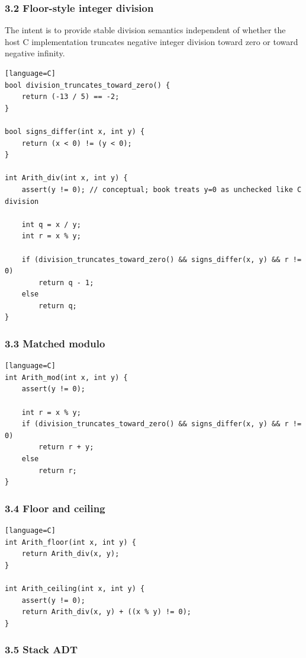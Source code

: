 \documentclass[11pt]{article}
\begin{document}
\subsubsection{3.2 Floor-style integer division}\label{floor-style-integer-division}

The intent is to provide stable division semantics independent of whether the host C implementation truncates negative integer division toward zero or toward negative infinity.

\begin{verbatim}[language=C]
bool division_truncates_toward_zero() {
    return (-13 / 5) == -2;
}

bool signs_differ(int x, int y) {
    return (x < 0) != (y < 0);
}

int Arith_div(int x, int y) {
    assert(y != 0); // conceptual; book treats y=0 as unchecked like C division

    int q = x / y;
    int r = x % y;

    if (division_truncates_toward_zero() && signs_differ(x, y) && r != 0)
        return q - 1;
    else
        return q;
}
\end{verbatim}

\subsubsection{3.3 Matched modulo}\label{matched-modulo}

\begin{verbatim}[language=C]
int Arith_mod(int x, int y) {
    assert(y != 0);

    int r = x % y;
    if (division_truncates_toward_zero() && signs_differ(x, y) && r != 0)
        return r + y;
    else
        return r;
}
\end{verbatim}

\subsubsection{3.4 Floor and ceiling}\label{floor-and-ceiling}

\begin{verbatim}[language=C]
int Arith_floor(int x, int y) {
    return Arith_div(x, y);
}

int Arith_ceiling(int x, int y) {
    assert(y != 0);
    return Arith_div(x, y) + ((x % y) != 0);
}
\end{verbatim}

\subsubsection{3.5 Stack ADT}\label{stack-adt}
\end{document}
